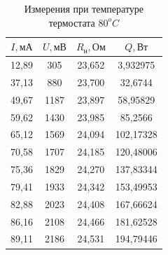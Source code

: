     \begin{table}[!ht]
        \begin{minipage}{.42\linewidth}
            \centering
            \begin{tabular}{|c|c|c|c|}
                \hline

                $I, \text{мА}$ & $U, \text{мВ}$ &  $R_\text{н}, \text{Ом}$ & $Q, \text{Вт}$\\ \hline
                12,89	& 305	& 23,652	& 3,932975 \\ \hline
                37,13	& 880	& 23,700	& 32,6744 \\ \hline
                49,67	& 1187	& 23,897    & 58,95829 \\ \hline
                59,62	& 1430	& 23,985	& 85,2566 \\ \hline
                65,12	& 1569	& 24,094	& 102,17328 \\ \hline
                70,58	& 1707	& 24,185	& 120,48006 \\ \hline
                75,36	& 1829	& 24,270	& 137,83344 \\ \hline
                79,41	& 1933	& 24,342	& 153,49953 \\ \hline
                82,88	& 2023	& 24,408	& 167,66624 \\ \hline
                86,16	& 2108	& 24,466	& 181,62528 \\ \hline
                89,11	& 2186	& 24,531	& 194,79446 \\ \hline

            \end{tabular}
            \caption{Измерения при температуре термостата $80^oC$}
            \label{table_80}
        \end{minipage}
    \end{table}